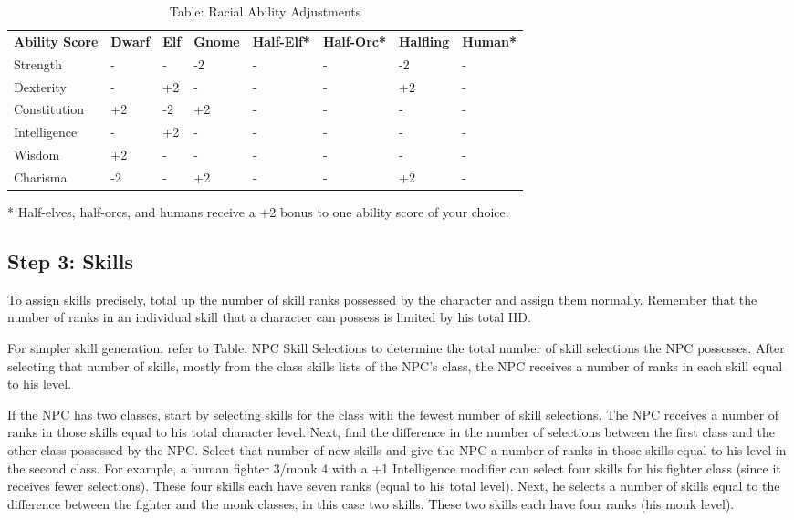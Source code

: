 \begin{table}[]
\sffamily
\caption{Table: Racial Ability Adjustments}
\begin{tabular}{llllllll}
\textbf{Ability Score} & \textbf{Dwarf} & \textbf{Elf} & \textbf{Gnome} & \textbf{Half-Elf*} & \textbf{Half-Orc*} & \textbf{Halfling} & \textbf{Human*}\\
Strength & - & - & -2 & - & - & -2 & - \\
 Dexterity & - & +2 & - & - & - & +2 & - \\
 Constitution & +2 & -2 & +2 & - & - & - & - \\
 Intelligence & - & +2 & - & - & - & - & - \\
 Wisdom & +2 & - & - & - & - & - & - \\
 Charisma & -2 & - & +2 & - & - & +2 & -\\
\end{tabular}
* Half-elves, half-orcs, and humans receive a +2 bonus to one ability score of your choice.\\
\end{table}

\subsection{Step 3: Skills}

				
To assign skills precisely, total up the number of skill ranks possessed by the character and assign them normally. Remember that the number of ranks in an individual skill that a character can possess is limited by his total HD.
				
For simpler skill generation, refer to Table: NPC Skill Selections to determine the total number of skill selections the NPC possesses. After selecting that number of skills, mostly from the class skills lists of the NPC's class, the NPC receives a number of ranks in each skill equal to his level. 
				
If the NPC has two classes, start by selecting skills for the class with the fewest number of skill selections. The NPC receives a number of ranks in those skills equal to his total character level. Next, find the difference in the number of selections between the first class and the other class possessed by the NPC. Select that number of new skills and give the NPC a number of ranks in those skills equal to his level in the second class. For example, a human fighter 3/monk 4 with a +1 Intelligence modifier can select four skills for his fighter class (since it receives fewer selections). These four skills each have seven ranks (equal to his total level). Next, he selects a number of skills equal to the difference between the fighter and the monk classes, in this case two skills. These two skills each have four ranks (his monk level).
				
